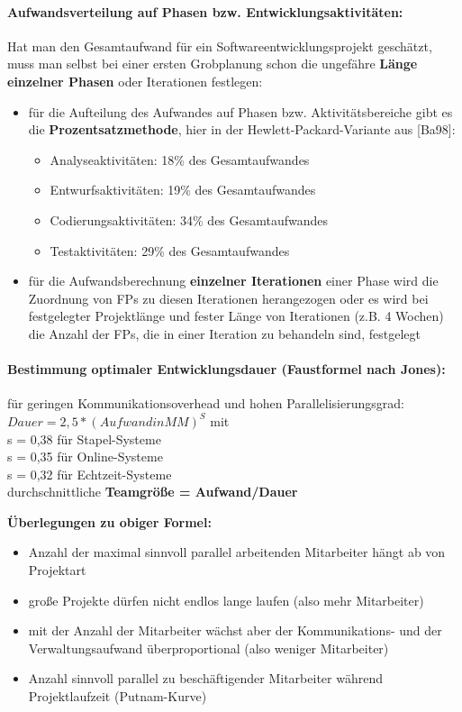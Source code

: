 \paragraph{Aufwandsverteilung auf Phasen bzw. Entwicklungsaktivitäten:}
Hat man den Gesamtaufwand für ein Softwareentwicklungsprojekt geschätzt, muss man selbst bei einer ersten Grobplanung schon die ungefähre \textbf{Länge einzelner Phasen} oder Iterationen festlegen:
\begin{itemize}
	\item für die Aufteilung des Aufwandes auf Phasen bzw. Aktivitätsbereiche gibt es die \textbf{Prozentsatzmethode}, hier in der Hewlett-Packard-Variante aus [Ba98]:
	\begin{itemize}
		\item Analyseaktivitäten: 18\% des Gesamtaufwandes
		\item Entwurfsaktivitäten: 19\% des Gesamtaufwandes
		\item Codierungsaktivitäten: 34\% des Gesamtaufwandes
		\item Testaktivitäten: 29\% des Gesamtaufwandes
	\end{itemize}
	\item für die Aufwandsberechnung \textbf{einzelner Iterationen} einer Phase wird die Zuordnung von FPs zu diesen Iterationen herangezogen oder es wird bei festgelegter Projektlänge und fester Länge von Iterationen (z.B. 4 Wochen) die Anzahl der FPs, die in einer Iteration zu behandeln sind, festgelegt
\end{itemize}

\paragraph{Bestimmung optimaler Entwicklungsdauer (Faustformel nach Jones):}
für geringen Kommunikationsoverhead und hohen Parallelisierungsgrad: \\
$Dauer = 2,5*(Aufwand in MM)^S$ mit \\
s = 0,38 für Stapel-Systeme \\
s = 0,35 für Online-Systeme \\
s = 0,32 für Echtzeit-Systeme \\
durchschnittliche \textbf{Teamgröße = Aufwand/Dauer}

\textbf{Überlegungen zu obiger Formel:}
\begin{itemize}
	\item Anzahl der maximal sinnvoll parallel arbeitenden Mitarbeiter hängt ab von Projektart
	\item große Projekte dürfen nicht endlos lange laufen (also mehr Mitarbeiter)
	\item mit der Anzahl der Mitarbeiter wächst aber der Kommunikations- und der Verwaltungsaufwand überproportional (also weniger Mitarbeiter)
	\item Anzahl sinnvoll parallel zu beschäftigender Mitarbeiter während Projektlaufzeit (Putnam-Kurve)
\end{itemize}

